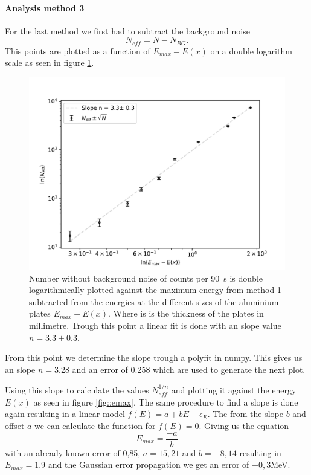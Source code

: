 \paragraph{Analysis method 3}
For the last method we first had to subtract the background noise 
\[
N_{eff}=N-N_{BG}.
\]
This points are plotted as a function of $E_{max}-E(x)$ on a double logarithm scale as seen in figure \ref{fig::loglog}.


\begin{figure} [ht]
	\centering
	\includegraphics[width=400pt]{python/loglog.png}
	\caption{Number without background noise of counts per \SI{90}{\second} is double logarithmically plotted against the maximum energy from method 1 subtracted from the energies at the different sizes of the aluminium plates $E_{max}-E(x)$. Where is is the thickness of the plates in millimetre. Trough this point a linear fit is done with an slope value $n=3.3\pm0.3$. }
	\label{fig::loglog}
\end{figure}

From this point we determine the slope trough a polyfit in numpy.
This gives us an slope $n= 3.28$ and an error of $0.258$ which are used to generate the next plot.


Using this slope to calculate the values $N_{eff}^{1/n}$ and plotting it against the energy $E(x)$ as seen in figure \ref{fig::emax}.
The same procedure to find a slope is done again resulting in a linear model $f(E) = a + bE + \epsilon_E$.
The from the slope $b$ and offset $a$ we can calculate the function for $f(E)=0$.
Giving us the equation 
\[
E_{max} = \frac{-a}{b}
\]
with an already known error of 0,85, $a=15,21$ and $b=-8,14$ resulting in $E_{max}=1.9$ and the Gaussian error propagation we get an error of $\pm 0,3$\si{\mega\electronvolt}.


